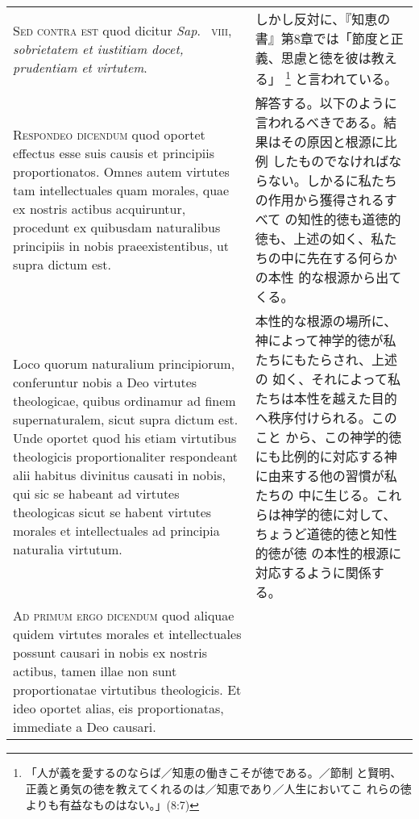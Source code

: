 \documentclass[10pt]{jsarticle}
\begin{document}
\begin{longtable}{p{21em}p{21em}}
\\



{\scshape Sed contra est} quod dicitur {\itshape Sap}.~{\scshape
viii}, {\itshape sobrietatem et iustitiam docet, prudentiam et
virtutem}.

&

 しかし反対に、『知恵の書』第8章では「節度と正義、思慮と徳を彼は教える」
 \footnote{「人が義を愛するのならば／知恵の働きこそが徳である。／節制
 と賢明、正義と勇気の徳を教えてくれるのは／知恵であり／人生においてこ
 れらの徳よりも有益なものはない。」(8:7)} と言われている。
 
\\



{\scshape Respondeo dicendum} quod oportet effectus esse suis causis
et principiis proportionatos. Omnes autem virtutes tam intellectuales
quam morales, quae ex nostris actibus acquiruntur, procedunt ex
quibusdam naturalibus principiis in nobis praeexistentibus, ut supra
 dictum est.


&

 解答する。以下のように言われるべきである。結果はその原因と根源に比例
 したものでなければならない。しかるに私たちの作用から獲得されるすべて
 の知性的徳も道徳的徳も、上述の如く、私たちの中に先在する何らかの本性
 的な根源から出てくる。
 
\\


 Loco quorum naturalium principiorum, conferuntur nobis a
Deo virtutes theologicae, quibus ordinamur ad finem supernaturalem,
sicut supra dictum est. Unde oportet quod his etiam virtutibus
theologicis proportionaliter respondeant alii habitus divinitus
causati in nobis, qui sic se habeant ad virtutes theologicas sicut se
habent virtutes morales et intellectuales ad principia naturalia
virtutum.

&

 本性的な根源の場所に、神によって神学的徳が私たちにもたらされ、上述の
 如く、それによって私たちは本性を越えた目的へ秩序付けられる。このこと
 から、この神学的徳にも比例的に対応する神に由来する他の習慣が私たちの
 中に生じる。これらは神学的徳に対して、ちょうど道徳的徳と知性的徳が徳
 の本性的根源に対応するように関係する。
 
\\



{\scshape Ad primum ergo dicendum} quod aliquae quidem virtutes
morales et intellectuales possunt causari in nobis ex nostris actibus,
tamen illae non sunt proportionatae virtutibus theologicis. Et ideo
oportet alias, eis proportionatas, immediate a Deo causari.


\end{longtable}
\end{document}
